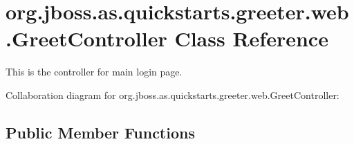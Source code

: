 \hypertarget{classorg_1_1jboss_1_1as_1_1quickstarts_1_1greeter_1_1web_1_1_greet_controller}{}\section{org.\+jboss.\+as.\+quickstarts.\+greeter.\+web.\+Greet\+Controller Class Reference}
\label{classorg_1_1jboss_1_1as_1_1quickstarts_1_1greeter_1_1web_1_1_greet_controller}


This is the controller for main login page.  




Collaboration diagram for org.\+jboss.\+as.\+quickstarts.\+greeter.\+web.\+Greet\+Controller\+:
\subsection*{Public Member Functions}
